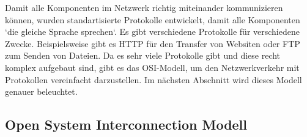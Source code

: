 \documentclass[12pt]{article}
\begin{document}
Damit alle Komponenten im Netzwerk richtig miteinander kommunizieren können, wurden standartisierte Protokolle entwickelt, damit alle Komponenten `die gleiche Sprache sprechen`. Es gibt verschiedene Protokolle für verschiedene Zwecke. Beispielsweise gibt es HTTP für den Transfer von Websiten oder FTP zum Senden von Dateien. Da es sehr viele Protokolle gibt und diese recht komplex aufgebaut sind, gibt es das OSI-Modell, um den Netzwerkverkehr mit Protokollen vereinfacht darzustellen. Im nächsten Abschnitt wird dieses Modell genauer beleuchtet.

\subsection{Open System Interconnection Modell}


	
	\begin{table}
		\centering
			\caption{OSI-Modell \cite{osi-table}}
		\label{fig:figure3}
	\end{table}
\end{document}
